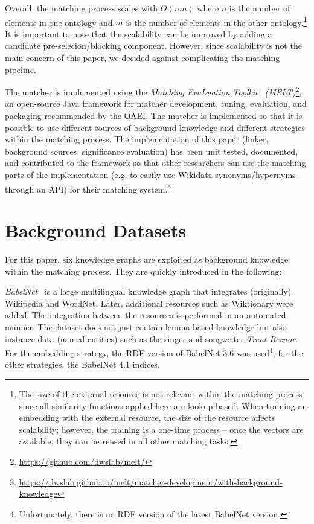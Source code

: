 \documentclass[runningheads]{llncs}
\begin{document}
Overall, the matching process scales with $O(nm)$ where $n$ is the number of elements in one ontology and $m$ is the number of elements in the other ontology.\footnote{The size of the external resource is not relevant within the matching process since all similarity functions applied here are lookup-based. When training an embedding with the external resource, the size of the resource affects scalability; however, the training is a one-time process -- once the vectors are available, they can be reused in all other matching tasks.}
It is important to note that the scalability can be improved by adding a candidate pre-selecion/blocking component. However, since scalability is not the main concern of this paper, we decided against complicating the matching pipeline. 


The matcher is implemented using the \textit{Matching EvaLuation} \textit{Toolkit}~\cite{hertling_melt_2019,DBLP:conf/semweb/HertlingPP20} \textit{(MELT)}\footnote{\url{https://github.com/dwslab/melt/}}, an open-source Java framework for matcher development, tuning, evaluation, and packaging recommended by the OAEI. 
The matcher is implemented so that it is possible to use different sources of background knowledge and different strategies within the matching process. The implementation of this paper (linker, background sources, significance evaluation) has been unit tested, documented, and contributed to the framework so that other researchers can use the matching parts of the implementation (e.g. to easily use Wikidata synonyms/hypernyms through an API) for their matching system.\footnote{\url{https://dwslab.github.io/melt/matcher-development/with-background-knowledge}}


\section{Background Datasets}
\label{sec:data_sets}
For this paper, six knowledge graphs are exploited as background knowledge within the matching process. They are quickly introduced in the following:

\emph{BabelNet}~\cite{babelnet} is a large multilingual knowledge graph that integrates (originally) Wikipedia and WordNet. Later, additional resources such as Wiktionary were added. The integration between the resources is performed in an automated manner. The dataset does not just contain lemma-based knowledge but also instance data (named entities) such as the singer and songwriter \textit{Trent Reznor}. For the embedding strategy, the RDF version of BabelNet 3.6 was used\footnote{Unfortunately, there is no RDF version of the latest BabelNet version.}, for the other strategies, the BabelNet 4.1 indices. 
\end{document}
